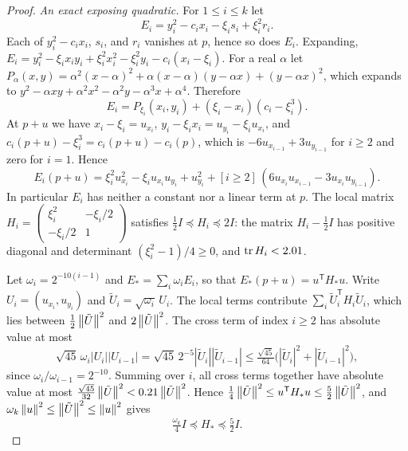 \begin{proof}
\emph{An exact exposing quadratic.} For $1\le i\le k$ let
\[
 E_i=y_i^2-c_ix_i-\xi_is_i+\xi_i^2r_i .
\]
Each of $y_i^2-c_ix_i$, $s_i$, and $r_i$ vanishes at $p$, hence so does $E_i$.
Expanding,
$E_i=y_i^2-\xi_ix_iy_i+\xi_i^2x_i^2-\xi_i^2y_i-c_i(x_i-\xi_i)$. For a real
$\alpha$ let
$P_\alpha(x,y)=\alpha^2(x-\alpha)^2+\alpha(x-\alpha)(y-\alpha x)+(y-\alpha x)^2$,
which expands to $y^2-\alpha xy+\alpha^2x^2-\alpha^2y-\alpha^3x+\alpha^4$.
Therefore
\[
 E_i=P_{\xi_i}(x_i,y_i)+(\xi_i-x_i)(c_i-\xi_i^3).
\]
At $p+u$ we have $x_i-\xi_i=u_{x_i}$,
$y_i-\xi_ix_i=u_{y_i}-\xi_iu_{x_i}$, and
$c_i(p+u)-\xi_i^3=c_i(p+u)-c_i(p)$, which is $-6u_{x_{i-1}}+3u_{y_{i-1}}$ for
$i\ge2$ and zero for $i=1$. Hence
\begin{equation}
 E_i(p+u)=\xi_i^2u_{x_i}^2-\xi_iu_{x_i}u_{y_i}+u_{y_i}^2
   +[i\ge2]\,(6u_{x_i}u_{x_{i-1}}-3u_{x_i}u_{y_{i-1}}).
 \label{eq:heights-cube-exposer}
\end{equation}
In particular $E_i$ has neither a constant nor a linear term at $p$. The
local matrix $H_i=\left(\begin{smallmatrix}\xi_i^2&-\xi_i/2\\-\xi_i/2&1
\end{smallmatrix}\right)$ satisfies $\frac12I\preceq H_i\preceq2I$: the matrix
$H_i-\frac12I$ has positive diagonal and determinant $(\xi_i^2-1)/4\ge0$, and
$\operatorname{tr} H_i<2.01$.

Let $\omega_i=2^{-10(i-1)}$ and $E_*=\sum_i\omega_iE_i$, so that
$E_*(p+u)=u^{\mathsf T}H_*u$. Write $U_i=(u_{x_i},u_{y_i})$ and
$\tilde U_i=\sqrt{\omega_i}\,U_i$. The local terms contribute
$\sum_i\tilde U_i^{\mathsf T}H_i\tilde U_i$, which lies between
$\frac12\left\lVert\tilde U\right\rVert^2$ and $2\left\lVert\tilde U\right\rVert^2$. The cross term of index
$i\ge2$ has absolute value at most
\[
 \sqrt{45}\,\omega_i|U_i||U_{i-1}|
 =\sqrt{45}\,2^{-5}|\tilde U_i||\tilde U_{i-1}|
 \le\tfrac{\sqrt{45}}{64}\bigl(|\tilde U_i|^2+|\tilde U_{i-1}|^2\bigr),
\]
since $\omega_i/\omega_{i-1}=2^{-10}$. Summing over $i$, all cross terms
together have absolute value at most
$\frac{\sqrt{45}}{32}\left\lVert\tilde U\right\rVert^2<0.21\left\lVert\tilde U\right\rVert^2$. Hence
$\frac14\left\lVert\tilde U\right\rVert^2\le u^{\mathsf T}H_*u\le\frac52\left\lVert\tilde U\right\rVert^2$,
and $\omega_k\left\lVert u\right\rVert^2\le\left\lVert\tilde U\right\rVert^2\le\left\lVert u\right\rVert^2$ gives
\begin{equation}
 \tfrac{\omega_k}4I\preceq H_*\preceq\tfrac52I.
 \label{eq:heights-cube-margin}
\end{equation}


\end{proof}
